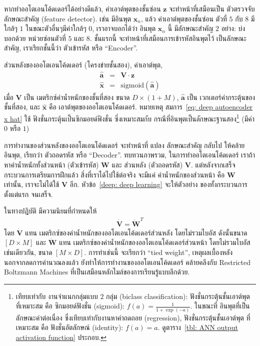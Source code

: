 หากทำออโตเอนโค้ดเดอร์ได้อย่างดีแล้ว, ค่าเอาต์พุตของชั้นซ่อน $\mathbf{z}$ จะทำหน้าที่เสมือนเป็น ตัวตรวจจับลักษณะสำคัญ (feature detector).
เช่น มีอินพุต $\mathbf{x}_n$, แล้ว ค่าเอาต์พุตของชั้นซ่อน ตัวที่ $5$ กับ $8$ มีใกล้ๆ $1$ ในขณะตัวอื่นๆมีค่าใกล้ๆ $0$, เราอาจบอกได้ว่า อินพุต $\mathbf{x}_n$ นี้ มีลักษณะสำคัญ $2$ อย่าง: บ่งบอกด้วย หน่วยซ่อนตัวที่ $5$ และ $8$.
ชั้นแรกนี้ จะทำหน้าที่เสมือนการเข้ารหัสอินพุตไว้ เป็นลักษณะสำคัญ, เราเรียกชั้นนี้ว่า ตัวเข้ารหัส หรือ ``Encoder''.

ส่วนหลังของออโตเอนโค้ดเดอร์ (โครงข่ายชั้นสอง), ค่าเอาต์พุต,
\begin{eqnarray}
\hat{\mathbf{a}} &=& \mathbf{V} \cdot \mathbf{z}
\label{eq: deep autoencoder a hat} \\
\hat{\mathbf{x}} &=& \mathrm{sigmoid}(\hat{\mathbf{a}})
\label{eq: deep autoencoder x hat}
\end{eqnarray}
เมื่อ $\mathbf{V}$ เป็น เมตริกซ์ค่าน้ำหนักของชั้นที่สอง ขนาด $D \times (1+M)$,
$\hat{\mathbf{a}}$ เป็น เวกเตอร์ค่ากระตุ้นของชั้นที่สอง,
และ $\hat{\mathbf{x}}$ คือ เอาต์พุตของออโตเอนโค้ดเดอร์.
หมายเหตุ สมการ~\ref{eq: deep autoencoder x hat} ใช้ ฟังชั่นกระตุ้นเป็นซิกมอยด์ฟังชั่น ซึ่งเหมาะสมกับ กรณีที่อินพุตเป็นลักษณะฐานสอง\footnote{
เทียบเท่ากับ งานจำแนกกลุ่มแบบ $2$ กลุ่ม (biclass classification): ฟังชั่นกระตุ้นชั้นเอาต์พุต ที่เหมาะสม คือ ซิกมอยด์ฟังชั่น (sigmoid): $f(a) = \frac{1}{1+\exp(-a)}$.
ในขณะที่ อินพุตที่เป็นลักษณะค่าต่อเนื่อง ซึ่งเทียบเท่ากับงานหาค่าถดถอย (regression),
ฟังชั่นกระตุ้นชั้นเอาต์พุต ที่เหมาะสม คือ ฟังชั่นอัตลักษณ์ (identity): $f(a) = a$.
%
ดูตาราง~\ref{tbl: ANN output activation function} ประกอบ.
} (มีค่า $0$ หรือ $1$)

การทำงานของส่วนหลังของออโตเอนโค้ดเดอร์ จะทำหน้าที่ แปลง ลักษณะสำคัญ กลับไป ให้คล้าย อินพุต, เรียกว่า ตัวถอดรหัส หรือ ``Decoder''.
ทบทวนภาพรวม, ในการทำออโตเอนโค้ดเดอร์ เราถ้าหาค่าน้ำหนักทั้งส่วนหน้า (ตัวเข้ารหัส) $\mathbf{W}$ และ ส่วนหลัง (ตัวถอดรหัส) $\mathbf{V}$. แต่หลังจากเสร็จกระบวนการเตรียมการฝึกแล้ว สิ่งที่เราได้ไปใช้ต่อจริง จะมีแค่ ค่าน้ำหนักของส่วนหน้า คือ $\mathbf{W}$ เท่านั้น, เราจะไม่ได้ใช้ $\mathbf{V}$ อีก.
หัวข้อ~\ref{deep: deep learning} จะให้ตัวอย่าง ของทั้งกระบวนการตั้งแต่แรก จนเสร็จ.

ในทางปฎิบัติ มีความนิยมที่กำหนดให้
\begin{eqnarray}
\mathbf{\dot{V}} = \mathbf{\dot{W}}^T
\label{eq: deep tied weight}
\end{eqnarray}
โดย $\mathbf{\dot{V}}$ แทน เมตริกซ์ของค่าน้ำหนักของออโตเอนโค้ดเดอร์ส่วนหลัง โดยไม่รวมไบอัส ดังนั้นขนาด $[D \times M]$
และ $\mathbf{\dot{W}}$ แทน เมตริกซ์ของค่าน้ำหนักของออโตเอนโค้ดเดอร์ส่วนหน้า โดยไม่รวมไบอัสเช่นเดียวกัน, ขนาด $[M \times D]$.
การทำเช่นนี้ จะเรียกว่า ``tied weight'', 
เหตุผลเบื้องหลัง นอกจากลดการคำนวณลงแล้ว ยังทำให้การทำงานของออโตเอนโค้ดเดอร์ คล้ายคลึงกับ Restricted Boltzmann Machines ที่เป็นเสมือนหลักไมล์ของการเรียนรู้แบบลึกด้วย.

